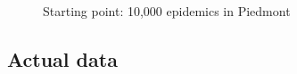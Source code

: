 \documentclass[graybox]{svmult}
\begin{document}
\begin{figure}[t]

 \begin{subfigure}{0.48\textwidth}
 \centering
 \label{10kNoControl}
 \end{subfigure}
 \hfill
 \begin{subfigure}{0.48\textwidth}
 \centering
 \label{10kBasicC}
 \end{subfigure}
 \caption{Starting point: 10,000 epidemics in Piedmont}
 \label{withoutWithFig}
\end{figure}


\subsection{Actual data}
\label{actual}
\end{document}
